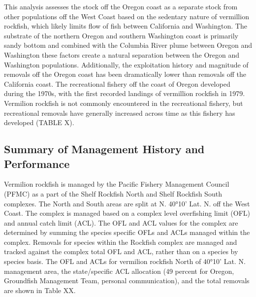 \documentclass[11pt,
  english,
  a4paper,
]{article}
\begin{document}
\leavevmode\tagmcend\tagstructend\par


This analysis assesses the stock off the Oregon coast as a separate stock from other populations off the West Coast based on the sedentary nature of vermillion rockfish, which likely limits flow of fish between California and Washington. The substrate of the northern Oregon and southern Washington coast is primarily sandy bottom and combined with the Columbia River plume between Oregon and Washington these factors create a natural separation between the Oregon and Washington populations. Additionally, the exploitation history and magnitude of removals off the Oregon coast has been dramatically lower than removals off the California coast. The recreational fishery off the coast of Oregon developed during the 1970s, with the first recorded landings of vermillion rockfish in 1979. Vermilion rockfish is not commonly encountered in the recreational fishery, but recreational removals have generally increased across time as this fishery has developed (TABLE X).

\leavevmode\tagmcend\tagstructend\par


\hypertarget{summary-of-management-history-and-performance}{%
\subsection{Summary of Management History and Performance}\label{summary-of-management-history-and-performance}}

\leavevmode\tagmcend\tagstructend


Vermilion rockfish is managed by the Pacific Fishery Management Council (PFMC) as a part of the Shelf Rockfish North and Shelf Rockfish South complexes. The North and South areas are split at N. 40°10' Lat. N. off the West Coast. The complex is managed based on a complex level overfishing limit (OFL) and annual catch limit (ACL). The OFL and ACL values for the complex are determined by summing the species specific OFLs and ACLs managed within the complex. Removals for species within the Rockfish complex are managed and tracked against the complex total OFL and ACL, rather than on a species by species basis. The OFL and ACLs for vermilion rockfish North of 40°10' Lat. N. management area, the state/specific ACL allocation (49 percent for Oregon, Groundfish Management Team, personal communication), and the total removals are shown in Table XX.
\end{document}

